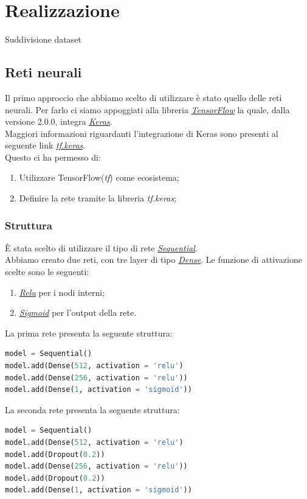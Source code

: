 \section{Realizzazione}
Suddivisione dataset

\subsection{Reti neurali}
Il primo approccio che abbiamo scelto di utilizzare è stato quello delle reti neurali.
Per farlo ci siamo appoggiati alla libreria \href{https://www.tensorflow.org/}{\textit{TensorFlow}} la quale, dalla versione 2.0.0, integra \href{https://keras.io/}{\textit{Keras}}.\\
Maggiori informazioni riguardanti l'integrazione di Keras sono presenti al seguente link \href{https://www.tensorflow.org/guide/keras}{\textit{tf.keras}}.\\ 
Questo ci ha permesso di:
\begin{enumerate}
	\item Utilizzare TensorFlow(\textit{tf}) come ecosistema;
	\item Definire la rete tramite la libreria \textit{tf.keras};
\end{enumerate} 
\subsubsection{Struttura}
È stata scelto di utilizzare il tipo di rete \href{https://keras.io/getting-started/sequential-model-guide/}{\textit{Sequential}}.\\ 
Abbiamo creato due reti, con tre layer di tipo \href{https://keras.io/layers/core/}{\textit{Dense}}.
Le funzione di attivazione scelte sono le seguenti:
\begin{enumerate}
	\item \href{https://keras.io/activations/#relu}{\textit{Relu}} per i nodi interni;
	\item \href{https://keras.io/activations/#sigmoid}{\textit{Sigmoid}} per l'output della rete.
\end{enumerate}
La prima rete presenta la seguente struttura:
\begin{lstlisting}[language=Python]
model = Sequential()  
model.add(Dense(512, activation = 'relu')
model.add(Dense(256, activation = 'relu'))
model.add(Dense(1, activation = 'sigmoid'))
\end{lstlisting}

La seconda rete presenta la seguente struttura:
\begin{lstlisting}[language=Python]
model = Sequential()
model.add(Dense(512, activation = 'relu')
model.add(Dropout(0.2))
model.add(Dense(256, activation = 'relu'))
model.add(Dropout(0.2))
model.add(Dense(1, activation = 'sigmoid'))
\end{lstlisting}

